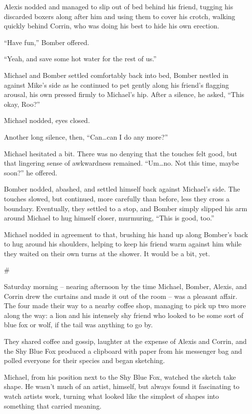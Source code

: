 \documentclass[12pt,letterpaper,oneside]{memoir}
\newcommand\secdiv{
  \begin{center}
    \#
  \end{center}
}
\begin{document}
  Alexis nodded and managed to slip out of bed behind his friend, tugging his discarded boxers along after him and using them to cover his crotch, walking quickly behind Corrin, who was doing his best to hide his own erection.

  ``Have fun,'' Bomber offered.

  ``Yeah, and save some hot water for the rest of us.''

  Michael and Bomber settled comfortably back into bed, Bomber nestled in against Mike's side as he continued to pet gently along his friend's flagging arousal, his own pressed firmly to Michael's hip.  After a silence, he asked, ``This okay, Roo?''

  Michael nodded, eyes closed.

  Another long silence, then, ``Can\ldots{}can I do any more?''

  Michael hesitated a bit.  There was no denying that the touches felt good, but that lingering sense of awkwardness remained.  ``Um\ldots{}no.  Not this time, maybe soon?'' he offered.

  Bomber nodded, abashed, and settled himself back against Michael's side.  The touches slowed, but continued, more carefully than before, less they cross a boundary.  Eventually, they settled to a stop, and Bomber simply slipped his arm around Michael to hug himself closer, murmuring, ``This is good, too.''

  Michael nodded in agreement to that, brushing his hand up along Bomber's back to hug around his shoulders, helping to keep his friend warm against him while they waited on their own turns at the shower.  It would be a bit, yet.

  \secdiv

  Saturday morning -- nearing afternoon by the time Michael, Bomber, Alexis, and Corrin drew the curtains and made it out of the room -- was a pleasant affair.  The four made their way to a nearby coffee shop, managing to pick up two more along the way: a lion and his intensely shy friend who looked to be some sort of blue fox or wolf, if the tail was anything to go by.

  They shared coffee and gossip, laughter at the expense of Alexis and Corrin, and the Shy Blue Fox produced a clipboard with paper from his messenger bag and polled everyone for their species and began sketching.

  Michael, from his position next to the Shy Blue Fox, watched the sketch take shape.  He wasn't much of an artist, himself, but always found it fascinating to watch artists work, turning what looked like the simplest of shapes into something that carried meaning.
\end{document}

